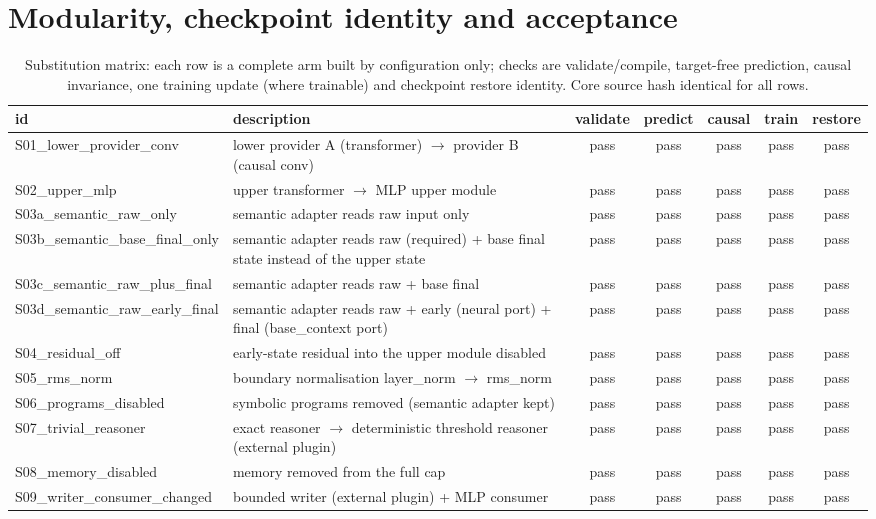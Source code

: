 \documentclass[10pt,a4paper]{article}
\begin{document}
\section{Modularity, checkpoint identity and acceptance}
\begin{table}[H]\centering\scriptsize
\caption{Substitution matrix: each row is a complete arm built by configuration only; checks are validate/compile, target-free prediction, causal invariance, one training update (where trainable) and checkpoint restore identity. Core source hash identical for all rows.}
\begin{tabular}{@{}l >{\raggedright\arraybackslash}p{5.4cm} ccccc@{}}\toprule
id & description & validate & predict & causal & train & restore\\\midrule
S01\_lower\_provider\_conv & lower provider A (transformer) $\to$ provider B (causal conv) & pass & pass & pass & pass & pass\\
S02\_upper\_mlp & upper transformer $\to$ MLP upper module & pass & pass & pass & pass & pass\\
S03a\_semantic\_raw\_only & semantic adapter reads raw input only & pass & pass & pass & pass & pass\\
S03b\_semantic\_base\_final\_only & semantic adapter reads raw (required) + base final state instead of the upper state & pass & pass & pass & pass & pass\\
S03c\_semantic\_raw\_plus\_final & semantic adapter reads raw + base final & pass & pass & pass & pass & pass\\
S03d\_semantic\_raw\_early\_final & semantic adapter reads raw + early (neural port) + final (base\_context port) & pass & pass & pass & pass & pass\\
S04\_residual\_off & early-state residual into the upper module disabled & pass & pass & pass & pass & pass\\
S05\_rms\_norm & boundary normalisation layer\_norm $\to$ rms\_norm & pass & pass & pass & pass & pass\\
S06\_programs\_disabled & symbolic programs removed (semantic adapter kept) & pass & pass & pass & pass & pass\\
S07\_trivial\_reasoner & exact reasoner $\to$ deterministic threshold reasoner (external plugin) & pass & pass & pass & pass & pass\\
S08\_memory\_disabled & memory removed from the full cap & pass & pass & pass & pass & pass\\
S09\_writer\_consumer\_changed & bounded writer (external plugin) + MLP consumer & pass & pass & pass & pass & pass\\
\bottomrule\end{tabular}\label{tab:subs}\end{table}
\end{document}
